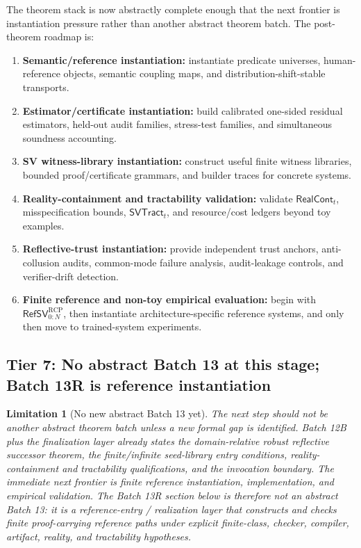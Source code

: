 \documentclass[11pt]{article}
\newtheorem{limitation}[theorem]{Limitation}
\newcommand{\1}{\mathbf{1}}
\newcommand{\RCP}{\mathrm{RCP}}
\begin{document}
The theorem stack is now abstractly complete enough that the next frontier is instantiation pressure rather than another abstract theorem batch. The post-theorem roadmap is:
\begin{enumerate}[label=(\Alph*),leftmargin=1.5em]
    \item \textbf{Semantic/reference instantiation:} instantiate predicate universes, human-reference objects, semantic coupling maps, and distribution-shift-stable transports.
    \item \textbf{Estimator/certificate instantiation:} build calibrated one-sided residual estimators, held-out audit families, stress-test families, and simultaneous soundness accounting.
    \item \textbf{SV witness-library instantiation:} construct useful finite witness libraries, bounded proof/certificate grammars, and builder traces for concrete systems.
    \item \textbf{Reality-containment and tractability validation:} validate \(\mathsf{RealCont}_t\), misspecification bounds, \(\mathsf{SVTract}_t\), and resource/cost ledgers beyond toy examples.
    \item \textbf{Reflective-trust instantiation:} provide independent trust anchors, anti-collusion audits, common-mode failure analysis, audit-leakage controls, and verifier-drift detection.
    \item \textbf{Finite reference and non-toy empirical evaluation:} begin with \(\mathsf{RefSV}_{0:N}^{\RCP}\), then instantiate architecture-specific reference systems, and only then move to trained-system experiments.
\end{enumerate}

\subsection{Tier 7: No abstract Batch 13 at this stage; Batch 13R is reference instantiation}

\begin{limitation}[No new abstract Batch 13 yet]
\label{lim:rcp2_no_batch13_yet}
The next step should not be another abstract theorem batch unless a new formal gap is identified. Batch 12B plus the finalization layer already states the domain-relative robust reflective successor theorem, the finite/infinite seed-library entry conditions, reality-containment and tractability qualifications, and the invocation boundary. The immediate next frontier is finite reference instantiation, implementation, and empirical validation. The Batch 13R section below is therefore not an abstract Batch 13: it is a reference-entry / realization layer that constructs and checks finite proof-carrying reference paths under explicit finite-class, checker, compiler, artifact, reality, and tractability hypotheses.
\end{limitation}
\end{document}
